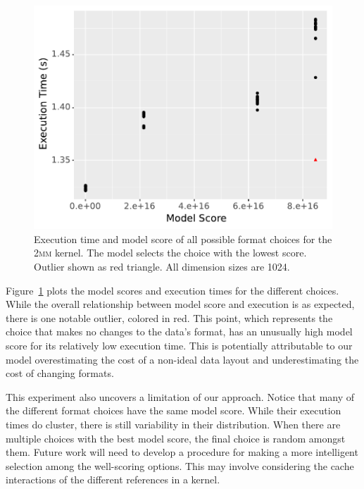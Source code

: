 \documentclass[sigconf,review=true]{acmart}
\begin{document}
\begin{figure}
	\includegraphics[width=\columnwidth]{2mm-all.pdf}
	\caption{Execution time and model score of all possible format choices for the \textsc{2mm} kernel. The model selects the choice with the lowest score. Outlier shown as red triangle. All dimension sizes are 1024.}
	\label{2MMAllChoices}
\end{figure}


Figure~\ref{2MMAllChoices} plots the model scores and execution times for the different choices. 
While the overall relationship between model score and execution is as expected, there is one notable outlier, colored in red.
This point, which represents the choice that makes no changes to the data's format, has an unusually high model score for its relatively low execution time. 
This is potentially attributable to our model overestimating the cost of a non-ideal data layout and underestimating the cost of changing formats. 

This experiment also uncovers a limitation of our approach.
Notice that many of the different format choices have the same model score.
While their execution times do cluster, there is still variability in their distribution.
When there are multiple choices with   the best model score, the final choice is random amongst them.
Future work will need to develop a procedure for making a more intelligent selection among the well-scoring options. 
This may involve considering the cache interactions of the different references in a kernel. 
\end{document}
